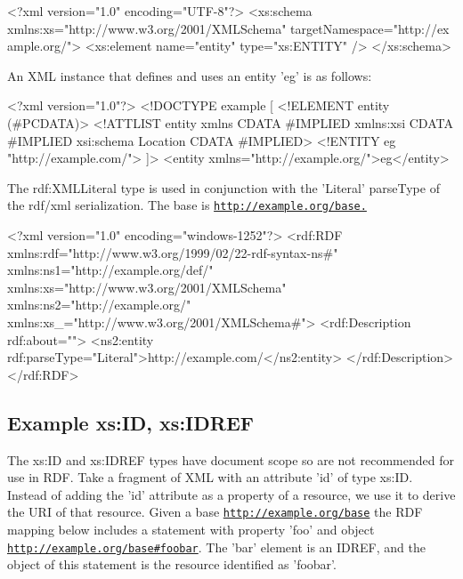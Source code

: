 \begin{DoxyCodeInclude}
<?xml version="1.0" encoding="UTF-8"?>
<xs:schema xmlns:xs="http://www.w3.org/2001/XMLSchema" targetNamespace="http://ex
      ample.org/">
        <xs:element name="entity" type="xs:ENTITY" />   
</xs:schema>
\end{DoxyCodeInclude}


An XML instance that defines and uses an entity 'eg' is as follows:


\begin{DoxyCodeInclude}
<?xml version="1.0"?>
<!DOCTYPE example [
        <!ELEMENT entity (#PCDATA)>
        <!ATTLIST entity xmlns CDATA #IMPLIED xmlns:xsi CDATA #IMPLIED xsi:schema
      Location CDATA #IMPLIED>
        <!ENTITY eg "http://example.com/">
]>
<entity xmlns="http://example.org/">eg</entity>
\end{DoxyCodeInclude}


The rdf:XMLLiteral type is used in conjunction with the 'Literal' parseType of the rdf/xml serialization. The base is \href{http://example.org/base.}{\tt http://example.org/base.}


\begin{DoxyCodeInclude}
<?xml version="1.0" encoding="windows-1252"?>
<rdf:RDF
    xmlns:rdf="http://www.w3.org/1999/02/22-rdf-syntax-ns#"
    xmlns:ns1="http://example.org/def/"
    xmlns:xs="http://www.w3.org/2001/XMLSchema"
    xmlns:ns2="http://example.org/"
    xmlns:xs_="http://www.w3.org/2001/XMLSchema#">
  <rdf:Description rdf:about="">
    <ns2:entity rdf:parseType="Literal">http://example.com/</ns2:entity>
  </rdf:Description>
</rdf:RDF>
\end{DoxyCodeInclude}
 \hypertarget{elementIdentity}{}\subsection{Example xs:ID, xs:IDREF}\label{elementIdentity}
The xs:ID and xs:IDREF types have document scope so are not recommended for use in RDF. Take a fragment of XML with an attribute 'id' of type xs:ID. Instead of adding the 'id' attribute as a property of a resource, we use it to derive the URI of that resource. Given a base {\ttfamily \href{http://example.org/base}{\tt http://example.org/base}} the RDF mapping below includes a statement with property 'foo' and object {\ttfamily \href{http://example.org/base#foobar}{\tt http://example.org/base\#foobar}}. The 'bar' element is an IDREF, and the object of this statement is the resource identified as 'foobar'.


